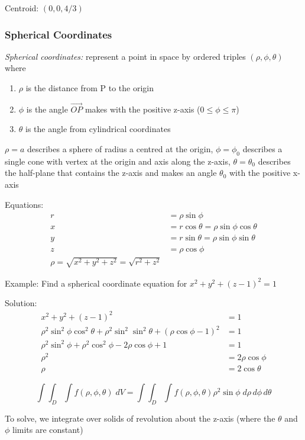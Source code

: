 \documentclass[12pt]{article}
\begin{document}
Centroid: $(0, 0, 4/3)$

\subsubsection{Spherical Coordinates}
\emph{Spherical coordinates:} represent a point in space by ordered triples $(\rho, \phi, \theta)$ where 
\begin{enumerate}
    \item $\rho$ is the distance from P to the origin
    \item $\phi$ is the angle $\vec{OP}$ makes with the positive z-axis ($0 \leq \phi \leq \pi$)
    \item $\theta$ is the angle from cylindrical coordinates
\end{enumerate}

$\rho = a$ describes a sphere of radius a centred at the origin, $\phi = \phi_0$ describes a single cone with vertex at the origin and axis along the z-axis, $\theta = \theta_0$ describes the half-plane that contains the z-axis and makes an angle $\theta_0$ with the positive x-axis

Equations:
\begin{align}
    r &= \rho \sin \phi\\
    x &= r\cos \theta = \rho \sin \phi \cos \theta\\
    y &= r\sin \theta = \rho \sin \phi \sin \theta\\
    z &= \rho \cos \phi\\
    \rho = \sqrt{x^2 + y^2 + z^2}  = \sqrt{r^2 + z^2}
\end{align}

Example: Find a spherical coordinate equation for $x^2 + y^2 + (z-1)^2 =1$

Solution:
\begin{align*}
    x^2 + y^2 + (z-1)^2 &= 1\\
    \rho^2 \sin^2 \phi \cos^2 \theta + \rho^2 \sin^2 \sin^2 \theta + (\rho \cos \phi -1)^2 &= 1\\
    \rho^2 \sin^2 \phi + \rho^2 \cos^2 \phi - 2\rho \cos \phi + 1 &= 1\\
    \rho^2 &= 2 \rho \cos \phi\\
    \rho &= 2 \cos \theta 
\end{align*}

\[\int \int_D \int f(\rho, \phi, \theta) \; dV = \int \int_D \int f(\rho, \phi, \theta) \rho^2 \sin \phi \; d\rho \, d\phi \, d\theta\]

To solve, we integrate over solids of revolution about the z-axis (where the $\theta$ and $\phi$ limits are constant)
\end{document}

